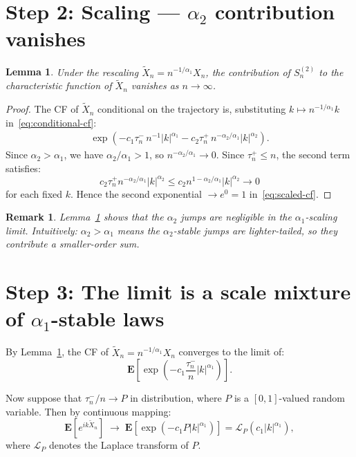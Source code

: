 \documentclass{amsart}
\newtheorem{lemma}[theorem]{Lemma}
\newtheorem{remark}[theorem]{Remark}
\theoremstyle{definition}
\begin{document}
\section{Step 2: Scaling --- $\alpha_2$ contribution vanishes}

\begin{lemma}
\label{lem:alpha2-vanishes}
Under the rescaling $\tilde{X}_n = n^{-1/\alpha_1} X_n$, the contribution of
$S_n^{(2)}$ to the characteristic function of $\tilde{X}_n$ vanishes as $n \to \infty$.
\end{lemma}

\begin{proof}
The CF of $\tilde{X}_n$ conditional on the trajectory is, substituting $k \mapsto n^{-1/\alpha_1} k$
in~\eqref{eq:conditional-cf}:
\begin{align}
    \label{eq:scaled-cf}
    \exp\!\left(
        -c_1 \tau_n^- \, n^{-1} |k|^{\alpha_1}
        - c_2 \tau_n^+ \, n^{-\alpha_2/\alpha_1} |k|^{\alpha_2}
    \right).
\end{align}
Since $\alpha_2 > \alpha_1$, we have $\alpha_2/\alpha_1 > 1$, so
$n^{-\alpha_2/\alpha_1} \to 0$.
Since $\tau_n^+ \leq n$, the second term satisfies:
\[
    c_2 \tau_n^+ n^{-\alpha_2/\alpha_1} |k|^{\alpha_2}
    \leq c_2 n^{1 - \alpha_2/\alpha_1} |k|^{\alpha_2} \to 0
\]
for each fixed $k$.
Hence the second exponential $\to e^0 = 1$ in~\eqref{eq:scaled-cf}.
\end{proof}

\begin{remark}
Lemma~\ref{lem:alpha2-vanishes} shows that the $\alpha_2$ jumps are \emph{negligible}
in the $\alpha_1$-scaling limit. Intuitively: $\alpha_2 > \alpha_1$ means the
$\alpha_2$-stable jumps are lighter-tailed, so they contribute a smaller-order sum.
\end{remark}

\section{Step 3: The limit is a scale mixture of $\alpha_1$-stable laws}

By Lemma~\ref{lem:alpha2-vanishes}, the CF of $\tilde{X}_n = n^{-1/\alpha_1} X_n$
converges to the limit of:
\[
    \mathbf{E}\!\left[
        \exp\!\left(-c_1 \frac{\tau_n^-}{n} |k|^{\alpha_1}\right)
    \right].
\]

Now suppose that $\tau_n^-/n \to P$ in distribution, where $P$ is a $[0,1]$-valued
random variable. Then by continuous mapping:
\begin{equation}
    \label{eq:mixture-cf}
    \mathbf{E}\!\left[e^{ik\tilde{X}_n}\right]
    \;\longrightarrow\;
    \mathbf{E}\!\left[\exp(-c_1 P |k|^{\alpha_1})\right]
    = \mathcal{L}_{P}\!\left(c_1 |k|^{\alpha_1}\right),
\end{equation}
where $\mathcal{L}_P$ denotes the Laplace transform of $P$.
\end{document}
